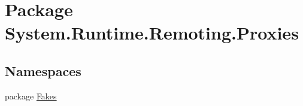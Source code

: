 \hypertarget{namespace_system_1_1_runtime_1_1_remoting_1_1_proxies}{\section{Package System.\-Runtime.\-Remoting.\-Proxies}
\label{namespace_system_1_1_runtime_1_1_remoting_1_1_proxies}
}
\subsection*{Namespaces}
\begin{DoxyCompactItemize}
\item 
package \hyperlink{namespace_system_1_1_runtime_1_1_remoting_1_1_proxies_1_1_fakes}{Fakes}
\end{DoxyCompactItemize}
